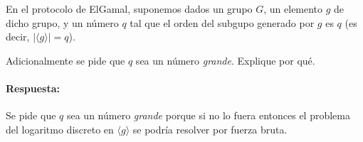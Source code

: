 
En el protocolo de ElGamal, suponemos dados un grupo $G$, un elemento $g$ de dicho grupo, y un número $q$ tal que el orden del subgupo generado por $g$ es $q$ (es decir, $|\langle g\rangle|=q$).

Adicionalmente se pide que $q$ sea un número {\it grande}. Explique por qué.
\paragraph{Respuesta:} Se pide que $q$ sea un número {\it grande} porque si no lo fuera entonces el problema del logaritmo discreto en $\langle g\rangle$ se podría resolver por fuerza bruta.

%
